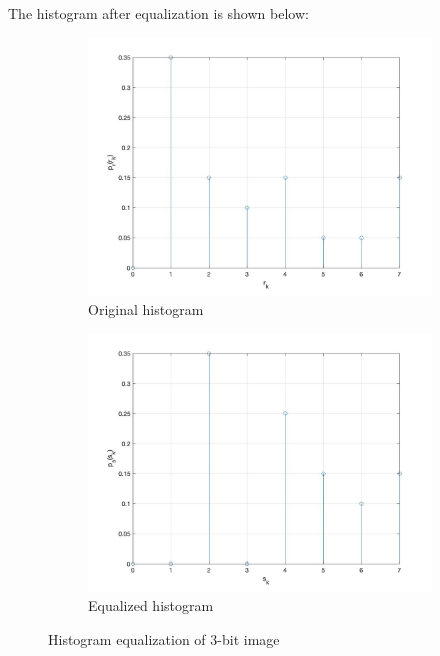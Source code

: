 \documentclass[conference]{IEEEtran}
\begin{document}
The histogram after equalization is shown below:
\begin{figure}[h!]
\centering
\begin{subfigure}[b]{0.4\linewidth}
\includegraphics[width=\linewidth]{images/img23.jpg}
\caption{Original histogram}
\end{subfigure}
\begin{subfigure}[b]{0.4\linewidth}
\includegraphics[width=\linewidth]{images/img25.jpg}
\caption{Equalized histogram}
\end{subfigure}
\caption{Histogram equalization of 3-bit image}
\label{fig: Histogram equalization of 3-bit image}
\end{figure}
\end{document}
